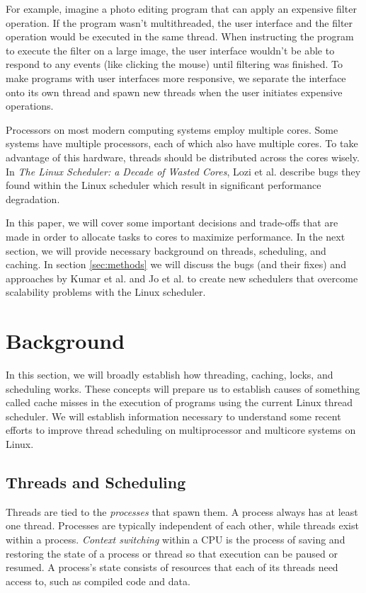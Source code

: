 \documentclass{sig-alternate}
\begin{document}
For example, imagine a photo editing program that can apply an expensive filter operation. If the program wasn't multithreaded, the user interface and the filter operation would be executed in the same thread. When instructing the program to execute the filter on a large image, the user interface wouldn't be able to respond to any events (like clicking the mouse) until filtering was finished. To make programs with user interfaces more responsive, we separate the interface onto its own thread and spawn new threads when the user initiates expensive operations.

Processors on most modern computing systems employ multiple cores. Some systems have multiple processors, each of which also have multiple cores. To take advantage of this hardware, threads should be distributed across the cores wisely. In \emph{The Linux Scheduler: a Decade of Wasted Cores}, Lozi et al. describe bugs they found within the Linux scheduler which result in significant performance degradation. 

In this paper, we will cover some important decisions and trade-offs that are made in order to allocate tasks to cores to maximize performance. In the next section, we will provide necessary background on threads, scheduling, and caching. In section \ref{sec:methods} we will discuss the bugs (and their fixes) and approaches by Kumar et al. and Jo et al. to create new schedulers that overcome scalability problems with the Linux scheduler.
\section{Background}
\label{sec:bg}

In this section, we will broadly establish how threading, caching, locks, and scheduling works. These concepts will prepare us to establish causes of something called cache misses in the execution of programs using the current Linux thread scheduler. We will establish information necessary to understand some recent efforts to improve thread scheduling on multiprocessor and multicore systems on Linux.

\subsection{Threads and Scheduling}
\label{sec:threads}

Threads are tied to the \emph{processes} that spawn them. A process always has at least one thread. Processes are typically independent of each other, while threads exist within a process. \emph{Context switching} within a CPU is the process of saving and restoring the state of a process or thread so that execution can be paused or resumed. A process's state consists of resources that each of its threads need access to, such as compiled code and data.
\end{document}
